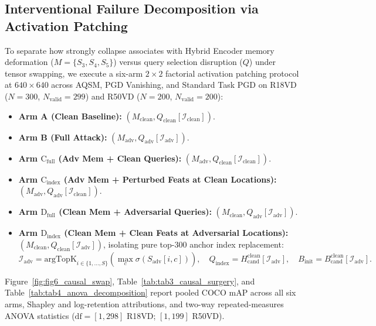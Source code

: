 \documentclass[preprint,10pt]{elsarticle}
\begin{document}
\subsection{Interventional Failure Decomposition via Activation Patching}
\label{sec:causal_surgery}
To separate how strongly collapse associates with Hybrid Encoder memory deformation ($M = \{S_3, S_4, S_5\}$) versus query selection disruption ($Q$) under tensor swapping, we execute a six-arm $2 \times 2$ factorial activation patching protocol at $640 \times 640$ across AQSM, PGD Vanishing, and Standard Task PGD on R18VD ($N = 300$, $N_{\mathrm{valid}} = 299$) and R50VD ($N = 200$, $N_{\mathrm{valid}} = 200$):
\begin{itemize}
    \item \textbf{Arm A (Clean Baseline):} $(M_{\mathrm{clean}}, Q_{\mathrm{clean}}[\mathcal{I}_{\mathrm{clean}}])$.
    \item \textbf{Arm B (Full Attack):} $(M_{\mathrm{adv}}, Q_{\mathrm{adv}}[\mathcal{I}_{\mathrm{adv}}])$.
    \item \textbf{Arm $\text{C}_{\text{full}}$ (Adv Mem + Clean Queries):} $(M_{\mathrm{adv}}, Q_{\mathrm{clean}}[\mathcal{I}_{\mathrm{clean}}])$.
    \item \textbf{Arm $\text{C}_{\text{index}}$ (Adv Mem + Perturbed Feats at Clean Locations):} $(M_{\mathrm{adv}}, Q_{\mathrm{adv}}[\mathcal{I}_{\mathrm{clean}}])$.
    \item \textbf{Arm $\text{D}_{\text{full}}$ (Clean Mem + Adversarial Queries):} $(M_{\mathrm{clean}}, Q_{\mathrm{adv}}[\mathcal{I}_{\mathrm{adv}}])$.
    \item \textbf{Arm $\text{D}_{\text{index}}$ (Clean Mem + Clean Feats at Adversarial Locations):} $(M_{\mathrm{clean}}, Q_{\mathrm{clean}}[\mathcal{I}_{\mathrm{adv}}])$, isolating pure top-300 anchor index replacement:
    \begin{equation}
    \mathcal{I}_{\mathrm{adv}} = \mathrm{argTopK}_{i \in \{1, \dots, S\}} \left( \max_c \sigma(S_{\mathrm{adv}}[i, c]) \right), \quad Q_{\mathrm{index}} = H_{\mathrm{cand}}^{\mathrm{clean}}[\mathcal{I}_{\mathrm{adv}}], \quad B_{\mathrm{init}} = B_{\mathrm{cand}}^{\mathrm{clean}}[\mathcal{I}_{\mathrm{adv}}].
    \label{eq:qindex_formulation}
    \end{equation}
\end{itemize}

Figure~\ref{fig:fig6_causal_swap}, Table~\ref{tab:tab3_causal_surgery}, and Table~\ref{tab:tab4_anova_decomposition} report pooled COCO mAP across all six arms, Shapley and log-retention attributions, and two-way repeated-measures ANOVA statistics ($\text{df} = [1, 298]$ R18VD; $[1, 199]$ R50VD).
\end{document}

